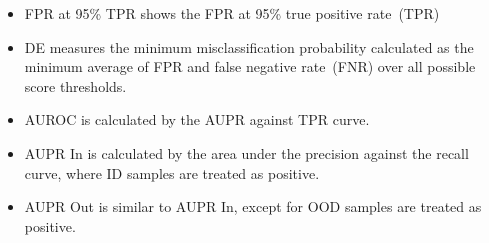 \vspace{-2mm}
\begin{itemize}[noitemsep]
    \item FPR at 95\% TPR shows the FPR at 95\% true positive rate~(TPR)
    \item DE measures the minimum misclassification probability calculated as the minimum average of FPR and false negative rate~(FNR) over all possible score thresholds.
    \item AUROC is calculated by the AUPR against TPR curve.
    \item AUPR In is calculated by the area under the precision against the recall curve, where ID samples are treated as positive.
    \item AUPR Out is similar to AUPR In, except for OOD samples are treated as positive. 
\end{itemize}

